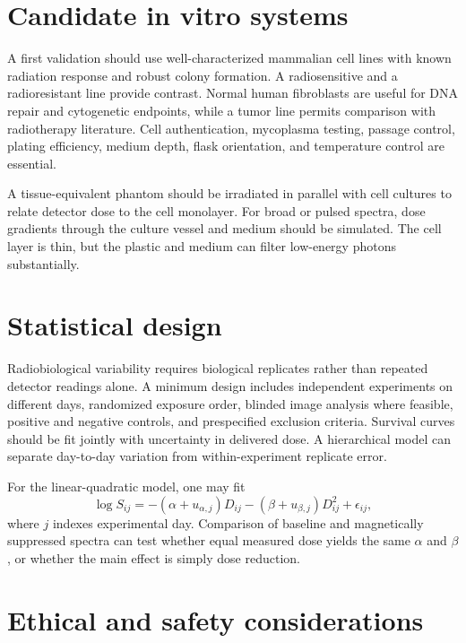 \section{Candidate in vitro systems}

A first validation should use well-characterized mammalian cell lines with known radiation response and robust colony formation. A radiosensitive and a radioresistant line provide contrast. Normal human fibroblasts are useful for DNA repair and cytogenetic endpoints, while a tumor line permits comparison with radiotherapy literature. Cell authentication, mycoplasma testing, passage control, plating efficiency, medium depth, flask orientation, and temperature control are essential.

A tissue-equivalent phantom should be irradiated in parallel with cell cultures to relate detector dose to the cell monolayer. For broad or pulsed spectra, dose gradients through the culture vessel and medium should be simulated. The cell layer is thin, but the plastic and medium can filter low-energy photons substantially.

\section{Statistical design}

Radiobiological variability requires biological replicates rather than repeated detector readings alone. A minimum design includes independent experiments on different days, randomized exposure order, blinded image analysis where feasible, positive and negative controls, and prespecified exclusion criteria. Survival curves should be fit jointly with uncertainty in delivered dose. A hierarchical model can separate day-to-day variation from within-experiment replicate error.

For the linear-quadratic model, one may fit
\begin{equation}
\log S_{ij}=-(\alpha+u_{\alpha,j})D_{ij}-(\beta+u_{\beta,j})D_{ij}^2+\epsilon_{ij},
\end{equation}
where $j$ indexes experimental day. Comparison of baseline and magnetically suppressed spectra can test whether equal measured dose yields the same $\alpha$ and $\beta$, or whether the main effect is simply dose reduction.

\section{Ethical and safety considerations}

